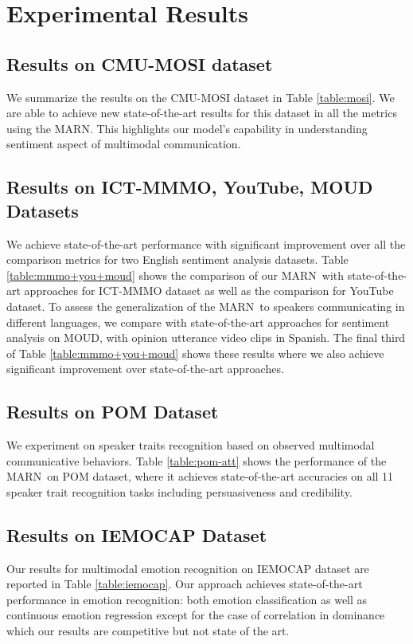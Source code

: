 \documentclass[letterpaper]{article} \usepackage{aaai18}  \usepackage{times}  \usepackage{helvet}  \usepackage{courier}  \usepackage{url}  \usepackage{graphicx}  \usepackage{multirow}
\newcommand{\pipelines}{MARN}
\begin{document}
\section{Experimental Results}

\subsection{Results on CMU-MOSI dataset}
We summarize the results on the CMU-MOSI dataset in Table \ref{table:mosi}. We are able to achieve new state-of-the-art results for this dataset in all the metrics using the \pipelines. This highlights our model's capability in understanding sentiment aspect of multimodal communication.

\subsection{Results on ICT-MMMO, YouTube, MOUD Datasets}
We achieve state-of-the-art performance with significant improvement over all the comparison metrics for two English sentiment analysis datasets. Table \ref{table:mmmo+you+moud} shows the comparison of our \pipelines \ with state-of-the-art approaches for ICT-MMMO dataset as well as the comparison for YouTube dataset. To assess the generalization of the \pipelines \ to speakers communicating in different languages, we compare with state-of-the-art approaches for sentiment analysis on MOUD, with opinion utterance video clips in Spanish. The final third of Table \ref{table:mmmo+you+moud} shows these results where we also achieve significant improvement over state-of-the-art approaches.

\subsection{Results on POM Dataset}
We experiment on speaker traits recognition based on observed multimodal communicative behaviors. Table \ref{table:pom-att} shows the performance of the \pipelines \ on POM dataset, where it achieves state-of-the-art accuracies on all 11 speaker trait recognition tasks including persuasiveness and credibility. 

\subsection{Results on IEMOCAP Dataset} 
Our results for multimodal emotion recognition on IEMOCAP dataset are reported in Table \ref{table:iemocap}. Our approach achieves state-of-the-art performance in emotion recognition: both emotion classification as well as continuous emotion regression except for the case of correlation in dominance which our results are competitive but not state of the art. 
\end{document}
